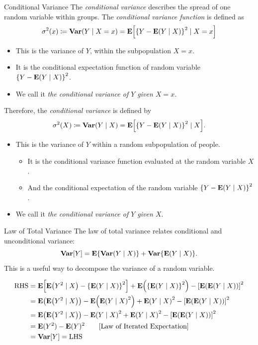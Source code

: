 \begin{df}{Conditional Variance}
	The \textit{conditional variance} describes the spread of one random variable within groups. The \textit{conditional variance function} is defined as \[\sigma^2(x)\coloneqq\vb{Var}(Y\mid X=x)=\vb{E}\qty[\qty{Y-\vb{E}(Y\mid X)}^2\mid X=x]\]
	\begin{itemize}
		\item This is the variance of $Y$, within the subpopulation $X=x$.
		\item It is the conditional expectation function of random variable $\qty{Y-\vb{E}(Y\mid X)}^2$.
		\item We call it \textit{the conditional variance of $Y$ given $X=x$}.
	\end{itemize}
	Therefore, the \textit{conditional variance} is defined by \[\sigma^2(X)\coloneqq\vb{Var}(Y\mid X)=\vb{E}\qty[\qty{Y-\vb{E}(Y\mid X)}^2\mid X].\]
	\begin{itemize}
		\item This is the variance of $Y$ within a random subpopulation of people.
		\begin{itemize}
			\item It is the conditional variance function evaluated at the random variable $X$.
			\item And the conditional expectation of the random variable $\qty{Y-\vb{E}(Y\mid X)}^2$.
		\end{itemize}
		\item We call it \textit{the conditional variance of $Y$ given $X$}.
	\end{itemize}
\end{df}
\begin{thm}{Law of Total Variance}
	The law of total variance relates conditional and unconditional variance: \[\vb{Var}[Y]=\vb{E}\qty{\vb{Var}(Y\mid X)}+\vb{Var}\qty{\vb{E}(Y\mid X)}.\] This is a useful way to decompose the variance of a random variable. 	
\end{thm}
\begin{prf}
	\begin{align*}
		\text{RHS}&=\vb{E}\qty[\vb{E}\qty(Y^2\mid X)-\qty{\vb{E}(Y\mid X)}^2]+\vb{E}\qty(\qty{\vb{E}(Y\mid X)}^2)-\qty[\vb{E}\qty(\vb{E}\qty(Y\mid X))]^2\\
		&=\vb{E}\qty(\vb{E}\qty(Y^2\mid X))-\vb{E}\qty(\vb{E}\qty(Y\mid X)^2)+\vb{E}\qty(Y\mid X)^2-\qty[\vb{E}(\vb{E}(Y\mid X))]^2\\
		&=\vb{E}\qty(\vb{E}\qty(Y^2\mid X))-\vb{E}\qty(Y\mid X)^2+\vb{E}\qty(Y\mid X)^2-\qty[\vb{E}(\vb{E}(Y\mid X))]^2\\
		&=\vb{E}(Y^2)-\vb{E}(Y)^2\qquad[\text{Law of Iterated Expectation}]\\
		&=\vb{Var}[Y]=\text{LHS}
	\end{align*}	
\end{prf}

